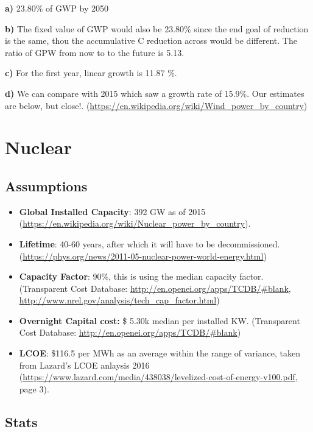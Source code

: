 \documentclass[11pt]{article}
\begin{document}
\colorbox{harvardcrimson!20}{ \textbf{a)}  } 23.80\% of GWP by 2050


\colorbox{harvardcrimson!20}{ \textbf{b)} } The fixed value of GWP would also be 23.80\% since the end goal of reduction is the same, thou the accumulative C reduction across would be different. The ratio of GPW from now to to the future is 5.13. 

\colorbox{harvardcrimson!20}{ \textbf{c)} }  For the first year, linear growth is 11.87 \%. 

\colorbox{harvardcrimson!20}{ \textbf{d)} } We can compare with 2015 which saw a growth rate of 15.9\%. Our estimates are below, but close!. (\url{https://en.wikipedia.org/wiki/Wind_power_by_country})


\section{Nuclear}

\subsection{Assumptions}
\begin{itemize}
\item \textbf{Global Installed Capacity}: 392 GW as of 2015 (\url{https://en.wikipedia.org/wiki/Nuclear_power_by_country}).
\item \textbf{Lifetime}: 40-60 years, after which it will have to be decommissioned.(\url{https://phys.org/news/2011-05-nuclear-power-world-energy.html})
\item \textbf{Capacity Factor}: 90\%, this is using the median capacity factor. (Transparent Cost Database: \url{http://en.openei.org/apps/TCDB/#blank}, \url{http://www.nrel.gov/analysis/tech_cap_factor.html})
\item \textbf{Overnight Capital cost:} \$ 5.30k median per installed KW. (Transparent Cost Database: \url{http://en.openei.org/apps/TCDB/#blank})
\item \textbf{LCOE}: \$116.5 per MWh  as an average within the range of variance, taken from Lazard's LCOE anlaysis 2016 (\url{https://www.lazard.com/media/438038/levelized-cost-of-energy-v100.pdf}, page 3).
\end{itemize}

\subsection{Stats}
\end{document}
